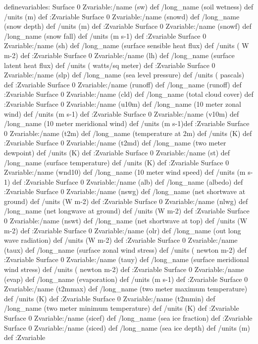 \begin{ingrid}
definevariables:
Surface 0 Zvariable:/name (sw) def /long_name (soil wetness)  def /units (m) def :Zvariable
Surface 0 Zvariable:/name (snowd) def /long_name (snow depth) def /units (m) def :Zvariable
Surface 0 Zvariable:/name (snowf) def /long_name (snow fall)  def /units (m s-1) def :Zvariable
Surface 0 Zvariable:/name (sh) def /long_name (surface sensible heat flux) def /units ( W m-2) def :Zvariable
Surface 0 Zvariable:/name (lh) def /long_name (surface latent heat flux) def /units ( watts/sq meter) def :Zvariable
Surface 0 Zvariable:/name (slp) def /long_name (sea level pressure) def /units ( pascals) def :Zvariable
Surface 0 Zvariable:/name (runoff) def /long_name (runoff) def :Zvariable
Surface 0 Zvariable:/name (cld) def /long_name (total cloud cover) def :Zvariable
Surface 0 Zvariable:/name (u10m) def /long_name (10 meter zonal wind) def /units (m s-1) def :Zvariable
Surface 0 Zvariable:/name (v10m) def /long_name (10 meter meridional wind) def /units (m s-1)def :Zvariable
Surface 0 Zvariable:/name (t2m) def /long_name (temperature at 2m) def /units (K) def :Zvariable
Surface 0 Zvariable:/name (t2md) def /long_name (two meter dewpoint) def /units (K) def :Zvariable
Surface 0 Zvariable:/name (st) def /long_name (surface temperature) def /units (K) def :Zvariable
Surface 0 Zvariable:/name (wnd10) def /long_name (10 meter wind speed) def /units (m s-1) def :Zvariable
Surface 0 Zvariable:/name (alb) def /long_name (albedo) def :Zvariable
Surface 0 Zvariable:/name (nswg) def /long_name (net shortwave at ground) def /units (W m-2) def :Zvariable
Surface 0 Zvariable:/name (nlwg) def /long_name (net longwave at ground) def /units (W m-2) def :Zvariable
Surface 0 Zvariable:/name (nswt) def /long_name (net shortwave at top) def /units (W m-2) def :Zvariable
Surface 0 Zvariable:/name (olr) def /long_name (out long wave radiation) def /units (W m-2) def :Zvariable
Surface 0 Zvariable:/name (taux) def /long_name (surface zonal wind stress) def /units ( newton m-2) def :Zvariable
Surface 0 Zvariable:/name (tauy) def /long_name (surface meridional wind stress) def /units ( newton m-2) def :Zvariable
Surface 0 Zvariable:/name (evap) def /long_name (evaporation) def /units (m s-1) def :Zvariable
Surface 0 Zvariable:/name (t2mmax) def /long_name (two meter maximum temperature) def /units (K) def :Zvariable
Surface 0 Zvariable:/name (t2mmin) def /long_name (two meter minimum temperature) def /units (K) def :Zvariable
Surface 0 Zvariable:/name (sicef) def /long_name (sea ice fraction) def :Zvariable
Surface 0 Zvariable:/name (siced) def /long_name (sea ice depth) def /units (m) def :Zvariable

\end{ingrid}
